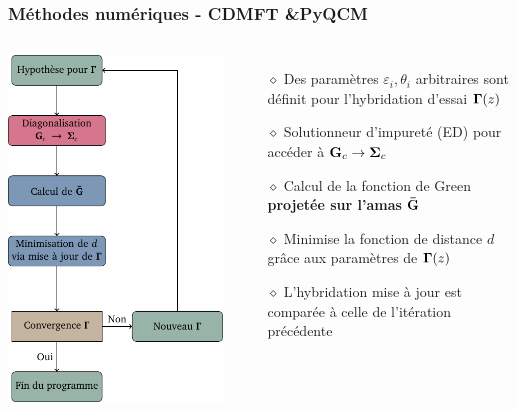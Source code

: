 \begin{frame}
    \frametitle{Méthodes numériques - CDMFT \&\;PyQCM}
    \begin{columns}
        \hspace{1cm}
        \includegraphics[scale=0.5]{./figures/theory/flow_chart.pdf}
        \begin{itemize}
            \item[$\diamond$] Des paramètres $\varepsilon_i, \theta_i$ arbitraires
                sont définit pour l'hybridation d'essai $\vb{\Gamma}(z)$
            \pause
            \item[$\diamond$] Solutionneur d'impureté (ED) pour accéder à
                $\vb{G}_c\to\vb{\Sigma}_c$
            \pause
            \item[$\diamond$] Calcul de la fonction de Green \textbf{projetée sur l'amas} $\vb{\bar{G}}$
            \pause
            \item[$\diamond$] Minimise la fonction de distance $d$ grâce aux paramètres de $\vb{\Gamma}(z)$
            \pause
            \item[$\diamond$] L'hybridation mise à jour est comparée à celle
                de l'itération précédente
        \end{itemize}
    \end{columns}
\end{frame}

